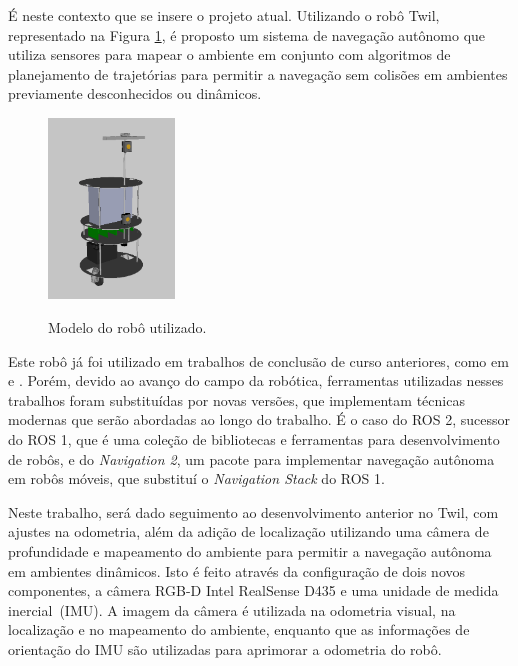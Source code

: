 \documentclass[repeatfields,xlists,xpacks,oneside,yearsonly]{ufrgscca}
\begin{document}
É neste contexto que se insere o projeto atual.
Utilizando o robô Twil, representado na Figura \ref{fig:robo_rviz},
é proposto um sistema de navegação autônomo que utiliza
sensores para mapear o ambiente em conjunto com algoritmos de planejamento
de trajetórias para permitir a navegação sem colisões em ambientes previamente
desconhecidos ou dinâmicos.

\begin{figure}[h]
    {
        \centering
        \caption{Modelo do robô utilizado.}
        \label{fig:robo_rviz}
        \includegraphics[width=0.3\textwidth]{robo_rviz.png}\\
    }
\end{figure}

Este robô já foi utilizado em trabalhos de conclusão de curso
anteriores, como em \textcite{petry_tcc} e \textcite{rahul_tcc}.
Porém, devido ao avanço do campo da robótica, ferramentas utilizadas
nesses trabalhos foram substituídas por novas versões, que
implementam técnicas modernas que serão abordadas ao longo do
trabalho. É o caso do ROS 2, sucessor do ROS 1, que é uma coleção de
bibliotecas e ferramentas para desenvolvimento de robôs, e do
\textit{Navigation 2}, um pacote para implementar navegação autônoma
em robôs móveis, que substituí o \textit{Navigation Stack} do ROS 1.

Neste trabalho, será dado seguimento ao desenvolvimento anterior no
Twil, com ajustes na odometria, além da adição de localização
utilizando uma câmera de profundidade e mapeamento do ambiente para
permitir a navegação autônoma em ambientes dinâmicos. Isto é feito
através da configuração de dois novos componentes, a câmera RGB-D
Intel RealSense D435 e uma unidade de medida inercial~(IMU). A imagem
da câmera é utilizada na odometria visual, na localização e no
mapeamento do ambiente, enquanto que as informações de orientação do
IMU são utilizadas para aprimorar a odometria do robô.
\end{document}
